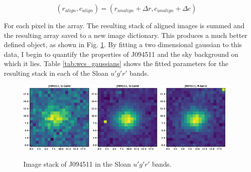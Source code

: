 \documentclass[a4paper,11pt]{article}
\begin{document}
\begin{equation}
    (r_{align}, c_{align}) = (r_{unalign} + \Delta r, c_{unalign} + \Delta c)
\end{equation}

\noindent For each pixel in the array. The resulting stack of aligned images is summed and the resulting array saved to a new image dictionary. This produces a much better defined object, as shown in Fig. \ref{fig:wcs_centroids}. By fitting a two dimensional gaussian to this data, I begin to quantify the properties of J094511 and the sky background on which it lies. Table \ref{tab:wcs_gaussians} shows the fitted parameters for the resulting stack in each of the Sloan $u'g'r'$ bands.

\begin{figure}[t]
    \includegraphics[width=0.32\textwidth]{wcs_centroid_U_stack.eps}
    \includegraphics[width=0.32\textwidth]{wcs_centroid_G_stack.eps}
    \includegraphics[width=0.32\textwidth]{wcs_centroid_R_stack.eps}
    \caption{Image stack of J094511 in the Sloan $u'g'r'$ bands.}
    \label{fig:wcs_centroids}
\end{figure}
\end{document}
